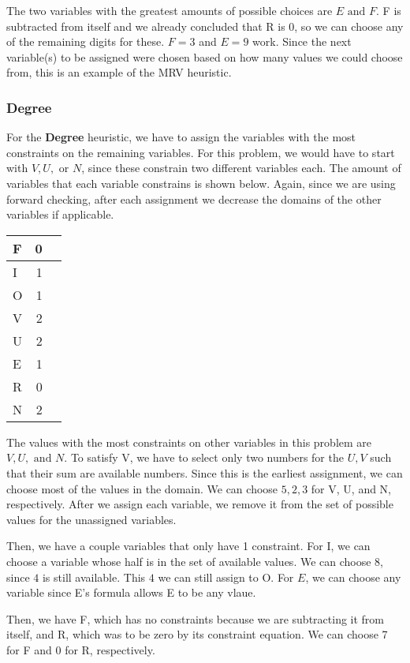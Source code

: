\documentclass{article}
\begin{document}
			The two variables with the greatest amounts of possible choices are $E \textrm{ and } F$. F is
			subtracted from itself and we already concluded that R is 0, so we can choose any of the remaining
			digits for these. $F = 3$ and $E = 9$ work. Since the next variable(s) to be assigned were chosen
			based on how many values we could choose from, this is an example of the MRV heuristic.
		\subsubsection{Degree}
			For the \textbf{Degree} heuristic, we have to assign the variables with the most constraints on the
			remaining variables. For this problem, we would have to start with $V, U, \textrm{ or }N$, since these
			constrain two different variables each. The amount of variables that each variable constrains
			is shown below. Again, since we are using forward checking, after each assignment we decrease the 
			domains of the other variables if applicable.
			\begin{center}
				\begin{tabular}{| l | r | c}
				\hline
				F & 0\\\hline 
				I & 1\\\hline
				O & 1\\\hline
				V & 2\\\hline
				U & 2\\\hline
				E & 1\\\hline
				R & 0\\\hline
				N & 2\\\hline
				\end{tabular}
			\end{center}
			The values with the most constraints on other variables in this problem are $V, U, \textrm{ and }N$.
			To satisfy V, we have to select only two numbers for the $U,V$ such that their sum are available 
			numbers. Since this is the earliest assignment, we can choose most of the values in the domain. We 
			can choose $5, 2, 3$ for V, U, and N, respectively. After we assign each variable, we remove it from
			the set of possible values for the unassigned variables.

			Then, we have a couple variables that only have 1 constraint. For I, we can choose a variable whose
			half is in the set of available values. We can choose $8$, since $4$ is still available. This $4$
			we can still assign to O. For $E$, we can choose any variable since E's formula allows E to be any 
			vlaue.

		Then, we have F, which has no constraints because we are subtracting it from itself, and R, which was to
		be zero by its constraint equation. We can choose 7 for F and 0 for R, respectively.
		\subsubsection{}
\end{document}
